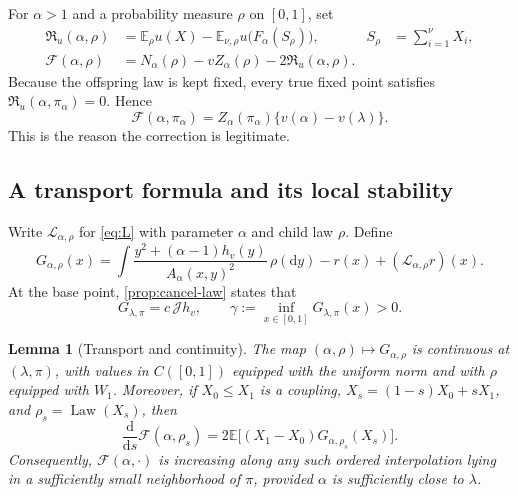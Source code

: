 \documentclass[11pt,a4paper]{article}
\numberwithin{equation}{section}
\theoremstyle{notethm}
\newtheorem{lemma}[lemma]{Lemma}
\theoremstyle{definition}
\newcommand{\E}{\mathbb E}
\newcommand{\Law}{\operatorname{Law}}
\newcommand{\cJ}{\mathcal J}
\newcommand{\cL}{\mathcal L}
\newcommand{\cF}{\mathscr F}
\newcommand{\res}{\mathfrak R}
\begin{document}
For $\alpha>1$ and a probability measure $\rho$ on $[0,1]$, set
\begin{align}
 \res_u(\alpha,\rho)
 &=\E_\rho u(X)-\E_{\nu,\rho}u\bigl(F_\alpha(S_\rho)\bigr),
 &S_\rho&=\sum_{i=1}^{\nu}X_i,\label{eq:residual}\\
 \cF(\alpha,\rho)
 &=N_\alpha(\rho)-vZ_\alpha(\rho)-2\res_u(\alpha,\rho).
 \label{eq:corrected-functional}
\end{align}
Because the offspring law is kept fixed, every true fixed point satisfies
$\res_u(\alpha,\pi_\alpha)=0$. Hence
\begin{equation}\label{eq:on-curve}
 \boxed{\quad
 \cF(\alpha,\pi_\alpha)
 =Z_\alpha(\pi_\alpha)\{v(\alpha)-v(\lambda)\}.
 \quad}
\end{equation}
This is the reason the correction is legitimate.

\subsection{A transport formula and its local stability}

Write $\cL_{\alpha,\rho}$ for \eqref{eq:L} with parameter $\alpha$ and
child law $\rho$. Define
\begin{equation}\label{eq:G-field}
 G_{\alpha,\rho}(x)
 =\int\frac{y^2+(\alpha-1)h_v(y)}{A_\alpha(x,y)^2}\,\rho(\mathrm dy)
   -r(x)+(\cL_{\alpha,\rho}r)(x).
\end{equation}
At the base point, \cref{prop:cancel-law} states that
\begin{equation}\label{eq:G-base}
 G_{\lambda,\pi}=c\,\cJ h_v,
 \qquad \gamma:=\inf_{x\in[0,1]}G_{\lambda,\pi}(x)>0.
\end{equation}

\begin{lemma}[Transport and continuity]\label{lem:transport}
The map $(\alpha,\rho)\mapsto G_{\alpha,\rho}$ is continuous at
$(\lambda,\pi)$, with values in $C([0,1])$ equipped with the uniform norm and
with $\rho$ equipped with $W_1$.
Moreover, if $X_0\le X_1$ is a coupling, $X_s=(1-s)X_0+sX_1$, and
$\rho_s=\Law(X_s)$, then
\begin{equation}\label{eq:transport-formula}
 \frac{\mathrm d}{\mathrm ds}\cF(\alpha,\rho_s)
 =2\E\bigl[(X_1-X_0)G_{\alpha,\rho_s}(X_s)\bigr].
\end{equation}
Consequently, $\cF(\alpha,\cdot)$ is increasing along any such ordered
interpolation lying in a sufficiently small neighborhood of $\pi$, provided
$\alpha$ is sufficiently close to $\lambda$.
\end{lemma}
\end{document}
